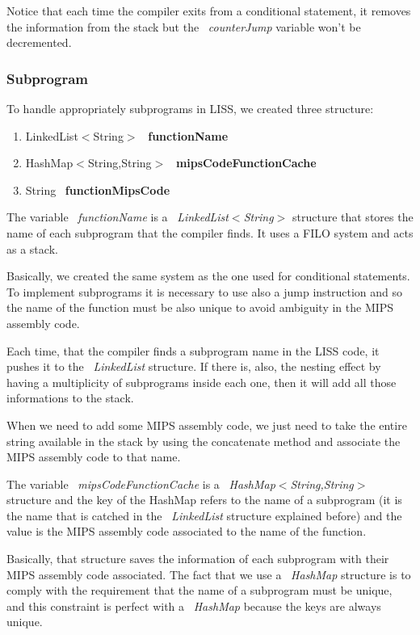\documentclass[
  oneside,
  11pt, a4paper,
  footinclude=true,
  headinclude=true,
  cleardoublepage=empty
]{scrbook}
\begin{document}
Notice that each time the compiler exits from a conditional statement, it removes the information from the stack but the ~\textit{counterJump} variable won't be decremented.

\subsubsection{Subprogram}

To handle appropriately subprograms in LISS, we created three structure:

\begin{enumerate}
\item LinkedList$<$String$>$ ~\textbf{functionName}
\item HashMap$<$String,String$>$ ~\textbf{mipsCodeFunctionCache}
\item String ~\textbf{functionMipsCode}
\end{enumerate}

The variable ~\textit{functionName} is a ~\textit{LinkedList$<$String$>$} structure that stores the name of each subprogram that the compiler finds. It uses a FILO system and acts as a stack.

Basically, we created the same system  as the one used for conditional statements. To implement subprograms it is necessary to use also a jump instruction and so the name of the function must be also unique to avoid ambiguity in the MIPS assembly code.

Each time, that the compiler finds a subprogram name in the LISS code, it pushes it to the ~\textit{LinkedList} structure. If there is, also, the nesting effect by having a multiplicity of subprograms inside each one, then it will add all those informations to the stack.

When we need to add some MIPS assembly code, we just need to take the entire string available in the stack by using the concatenate method and associate the MIPS assembly code to that name.

The variable ~\textit{mipsCodeFunctionCache} is a ~\textit{HashMap$<$String,String$>$} structure and the key of the HashMap refers to the name of a subprogram (it is the name that is catched in the ~\textit{LinkedList} structure explained before) and the value is the MIPS assembly code associated to the name of the function.

Basically, that structure saves the information of each subprogram with their MIPS assembly code associated. The fact that we use a ~\textit{HashMap} structure is to comply with the requirement that the name of a subprogram must be unique, and this constraint is perfect with a ~\textit{HashMap} because the keys are always unique.
\end{document}
